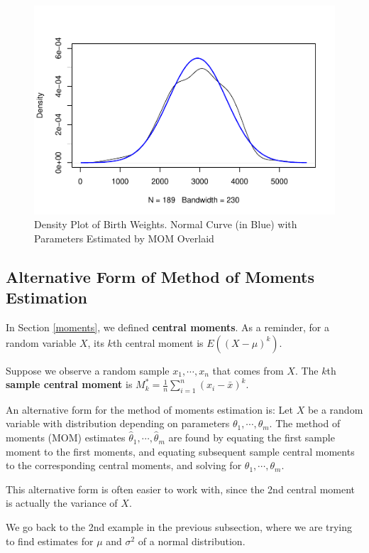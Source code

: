 \documentclass[
]{book}
\begin{document}
\begin{figure}
\centering
\includegraphics{bookdown-demo_files/figure-latex/7-MOM-1.pdf}
\caption{\label{fig:7-MOM}Density Plot of Birth Weights. Normal Curve (in Blue) with Parameters Estimated by MOM Overlaid}
\end{figure}

\subsection{Alternative Form of Method of Moments Estimation}\label{alternative-form-of-method-of-moments-estimation}

In Section \ref{moments}, we defined \textbf{central moments}. As a reminder, for a random variable \(X\), its \(k\)th central moment is \(E((X-\mu)^k)\).

Suppose we observe a random sample \(x_1, \cdots, x_n\) that comes from \(X\). The \(k\)th \textbf{sample central moment} is \(M_k^* = \frac{1}{n} \sum_{i=1}^n (x_i - \bar{x})^k\).

An alternative form for the method of moments estimation is: Let \(X\) be a random variable with distribution depending on parameters \(\theta_1, \cdots, \theta_m\). The method of moments (MOM) estimates \(\hat{\theta}_1, \cdots, \hat{\theta}_m\) are found by equating the first sample moment to the first moments, and equating subsequent sample central moments to the corresponding central moments, and solving for \(\theta_1, \cdots, \theta_m\).

This alternative form is often easier to work with, since the 2nd central moment is actually the variance of \(X\).

We go back to the 2nd example in the previous subsection, where we are trying to find estimates for \(\mu\) and \(\sigma^2\) of a normal distribution.
\end{document}
